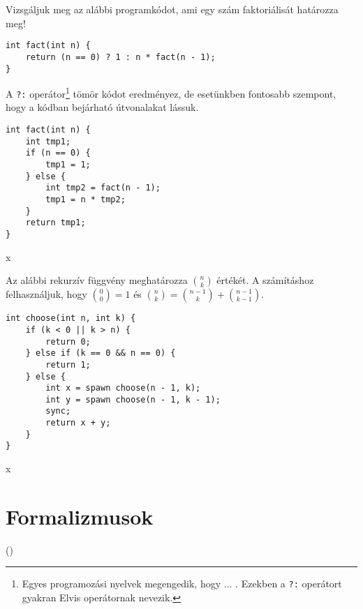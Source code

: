 Vizsgáljuk meg az alábbi programkódot, ami egy szám faktoriálisát határozza meg!

\begin{lstlisting}
int fact(int n) {
	return (n == 0) ? 1 : n * fact(n - 1);
}
\end{lstlisting}

A \lstinline{?:} operátor\footnote{Egyes programozási nyelvek megengedik, hogy ... . Ezekben a \lstinline{?:} operátort gyakran Elvis operátornak nevezik.} tömör kódot eredményez, de esetünkben fontosabb szempont, hogy a kódban bejárható útvonalakat lássuk.

\begin{minipage}{0.5\linewidth}
\begin{lstlisting}
int fact(int n) {
	int tmp1;
	if (n == 0) {
		tmp1 = 1;
	} else {
		int tmp2 = fact(n - 1);
		tmp1 = n * tmp2;
	}
	return tmp1;
}
\end{lstlisting}
\end{minipage}
\begin{minipage}{0.5\linewidth}
	x
\end{minipage}

Az alábbi rekurzív függvény meghatározza $n \choose k$ értékét. A számításhoz felhasználjuk, hogy ${0 \choose 0} = 1$ és ${n \choose k} = {n-1 \choose k} + {n-1 \choose k-1}$.


\begin{minipage}{0.5\linewidth}
\begin{lstlisting}
int choose(int n, int k) {
	if (k < 0 || k > n) {
		return 0;
	} else if (k == 0 && n == 0) {
		return 1;
	} else {
		int x = spawn choose(n - 1, k);
		int y = spawn choose(n - 1, k - 1);
		sync;
		return x + y;
	}
}
\end{lstlisting}
\end{minipage}
\begin{minipage}{0.5\linewidth}
	x
\end{minipage}



\section{Formalizmusok}

  ()






